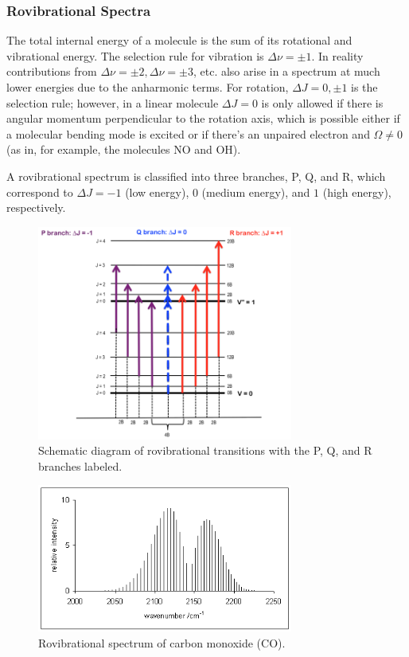 \documentclass{article}
\begin{document}
\subsubsection{Rovibrational Spectra}

The total internal energy of a molecule is the sum of its rotational and vibrational energy. The selection rule for vibration is  $\Delta \nu = \pm 1$. In reality contributions from $\Delta \nu = \pm 2, \Delta \nu = \pm 3$, etc. also arise in a spectrum at much lower energies due to the anharmonic terms. For rotation, $\Delta J = 0, \pm 1$ is the selection rule; however, in a linear molecule $\Delta J = 0$ is only allowed if there is angular momentum perpendicular to the rotation axis, which is possible either if a molecular bending mode is excited or if there's an unpaired electron and $\Omega \neq 0$ (as in, for example, the molecules NO and OH).

A rovibrational spectrum is classified into three branches, P, Q, and R, which correspond to $\Delta J = - 1$ (low energy), $0$ (medium energy), and $1$ (high energy), respectively.

\begin{figure}[ht]
    \centering
    \includegraphics[width = 0.75\textwidth]{Pqr.png}
    \caption{Schematic diagram of rovibrational transitions with the P, Q, and R branches labeled.}
    \label{fig:pqr}
\end{figure}

\begin{figure}[ht]
    \centering
    \includegraphics[width = 0.75\textwidth]{Co.png}
    \caption{Rovibrational spectrum of carbon monoxide (CO).}
    \label{fig:rovibrational}
\end{figure}
\end{document}
